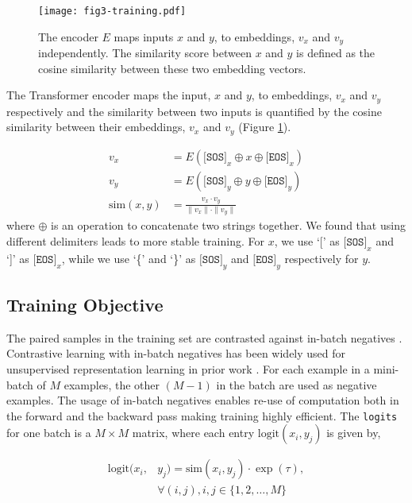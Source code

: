 \documentclass[nohyperref]{article}
\begin{document}
\begin{figure}[h]
\centering
\texttt{[image: fig3-training.pdf]}
\caption{The encoder $E$ maps inputs $x$ and $y$, to embeddings, $v_x$ and $v_y$ independently. The similarity score between $x$ and $y$ is defined as the cosine similarity between these two embedding vectors.}
\label{fig:train}
\end{figure}

The Transformer encoder maps the input, $x$ and $y$, to embeddings, $v_x$ and $v_y$ respectively and the similarity between two inputs is quantified by the cosine similarity between their embeddings, $v_x$ and $v_y$ (Figure \ref{fig:train}).

$$
\begin{aligned}
v_x &= E(\texttt{[SOS]}_x \oplus x \oplus \texttt{[EOS]}_x) \\
v_y &= E(\texttt{[SOS]}_y \oplus y \oplus \texttt{[EOS]}_y) \\
\text{sim}(x,y) &= \frac{v_x \cdot v_y}{\|v_x\| \cdot \|v_y\|} 
\end{aligned}
$$
where $\oplus$ is an operation to concatenate two strings together. We found that using different delimiters leads to more stable training. For $x$, we use `['  as $\texttt{[SOS]}_x$ and `]' as $\texttt{[EOS]}_x$, while we use `\{' and `\}' as $\texttt{[SOS]}_y$ and $\texttt{[EOS]}_y$ respectively for $y$. 

\subsection{Training Objective}
\label{sec:training}

The paired samples in the training set are contrasted against in-batch negatives \cite{contrastive,inbatch}. Contrastive learning with in-batch negatives has been widely used for unsupervised representation learning in prior work \cite{clip,align,Chen,contreiver}. For each example in a mini-batch of $M$ examples, the other $(M-1)$ in the batch are used as negative examples. The usage of in-batch negatives enables re-use of computation both in the forward and the backward pass making training highly efficient. The \texttt{logits} for one batch is a $M\times M$ matrix, where each entry $\text{logit}(x_i,y_j)$ is given by,

\begin{equation*}
\begin{split}
\text{logit}(x_i, &y_j)  = \text{sim}(x_i, y_j) \cdot \exp(\tau), \\
 & \forall (i,j), i,j \in \{1,2,\ldots,M\}
\end{split}
\end{equation*}
\end{document}

